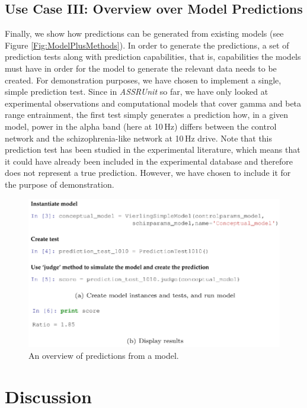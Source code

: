 \documentclass[CompPsych]{stjour}
\begin{document}
\subsection{Use Case III: Overview over Model Predictions}
Finally, we show how predictions can be generated from existing models (see Figure \ref{Fig:ModelPlusMethods}). In order to generate the predictions, a set of prediction tests along with prediction capabilities, that is, 
capabilities the models must have 
in order for the model to generate the relevant data needs to be created. For demonstration purposes, we have chosen to implement a single, simple prediction test. Since in \textit{ASSRUnit} so far, we have only looked 
at experimental observations and computational models that cover gamma and beta range entrainment, the first test simply generates a prediction how, in a given model, power in the alpha band (here at 10\,Hz)
differs between the control network and the schizophrenia-like network at 10\,Hz drive.
Note that this prediction 
test has been studied in the experimental literature, which means that it could have already been included in the experimental database and therefore does not represent a true prediction.
However, we have chosen to include it for the purpose of demonstration. 
 
\begin{figure}
\includegraphics[width=\textwidth]{Figures/figure-predictions}
\caption{An overview of predictions from a model.}
\label{Fig:Tests4040}
\end{figure}


\section{Discussion}
\end{document}
